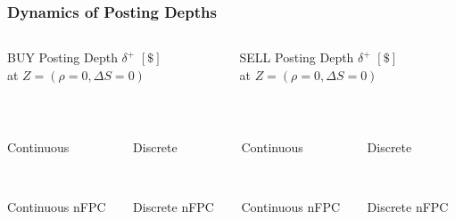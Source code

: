 \begin{frame}
\frametitle{Dynamics of Posting Depths}
\begin{columns}[T] %
\begin{column}{.48\textwidth}
BUY Posting Depth $\delta^+$ $[\$]$\\
at $Z=(\rho = 0, \Delta S = 0)$
\end{column}%
\hfill%
\begin{column}{.48\textwidth}
SELL Posting Depth $\delta^+$ $[\$]$\\
at $Z=(\rho = 0, \Delta S = 0)$
\end{column}%
\end{columns}
\vspace{\baselineskip}
\begin{columns}[T] %
\begin{column}{.24\textwidth}
\centering%
\\
{\scriptsize Continuous \par}
\\
{\scriptsize Continuous nFPC \par}
\end{column}%
\begin{column}{.24\textwidth}
\centering%
\\
{\scriptsize Discrete \par}
\\
{\scriptsize Discrete nFPC \par}
\end{column}%
\hfill%
\vrule{}
\hfill%
\begin{column}{.24\textwidth}
\centering%
\\
{\scriptsize Continuous \par}
\\
{\scriptsize Continuous nFPC \par}
\end{column}%
\begin{column}{.24\textwidth}
\centering%
\\
{\scriptsize Discrete \par}
\\
{\scriptsize Discrete nFPC \par}
\end{column}%
\end{columns}
\vspace{\baselineskip}
\centering
{}
\end{frame}

